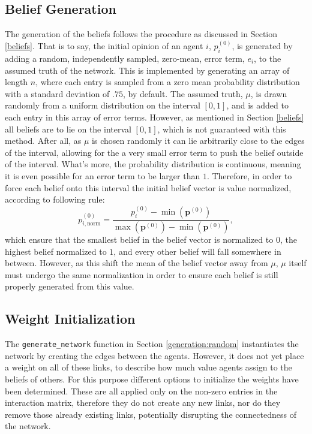 \documentclass[a4paper, 12pt]{report}
\newcommand{\beli}[3][2]{p_{#2}^{(#3)}}
\begin{document}
\newpage
\subsection{Belief Generation}

The generation of the beliefs follows the procedure as discussed in Section \ref{beliefs}. That is to say, the initial opinion of an agent $i$, $\beli{i}{0}$, is generated by adding a random, independently sampled, zero-mean, error term, $e_i$, to the assumed truth of the network. This is implemented by generating an array of length $n$, where each entry is sampled from a zero mean probability distribution with a standard deviation of $.75$, by default. The assumed truth, $\mu$, is drawn randomly from a uniform distribution on the interval $[0, 1]$, and is added to each entry in this array of error terms. \newline
However, as mentioned in Section \ref{beliefs} all beliefs are to lie on the interval $[0, 1]$, which is not guaranteed with this method. After all, as $\mu$ is chosen randomly it can lie arbitrarily close to the edges of the interval, allowing for the a very small error term to push the belief outside of the interval. What's more, the probability distribution is continuous, meaning it is even possible for an error term to be larger than $1$.  Therefore, in order to force each belief onto this interval the initial belief vector is value normalized, according to following rule:
\begin{equation*}
    \beli{i, \text{norm}}{0} = \frac{\beli{i}{0} - \min(\bm{p}^{(0)})}{\max(\bm{p}^{(0)}) - \min(\bm{p}^{(0)})},
\end{equation*}
which ensure that the smallest belief in the belief vector is normalized to $0$, the highest belief normalized to $1$, and every other belief will fall somewhere in between. However, as this shift the mean of the belief vector away from $\mu$, $\mu$ itself must undergo the same normalization in order to ensure each belief is still properly generated from this value.
\newline

\subsection{Weight Initialization}
The \texttt{generate\_network} function in Section \ref{generation:random} instantiates the network by creating the edges between the agents. However, it does not yet place a weight on all of these links, to describe how much value agents assign to the beliefs of others. For this purpose different options to initialize the weights have been determined. These are all applied only on the non-zero entries in the interaction matrix, therefore they do not create any new links, nor do they remove those already existing links, potentially disrupting the connectedness of the network. 
\end{document}
